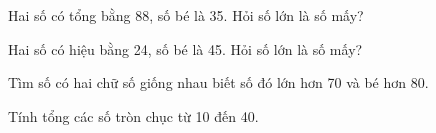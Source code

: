 \begin{ex} %
Hai số có tổng bằng 88, số bé là 35. Hỏi số lớn là số mấy?
\end{ex}

\begin{ex} %
Hai số có hiệu bằng 24, số bé là 45. Hỏi số lớn là số mấy?
\end{ex}

\begin{ex} %
Tìm số có hai chữ số giống nhau biết số đó lớn hơn 70 và bé hơn 80.
\end{ex}

\begin{ex} %
Tính tổng các số tròn chục từ 10 đến 40.
\end{ex}
